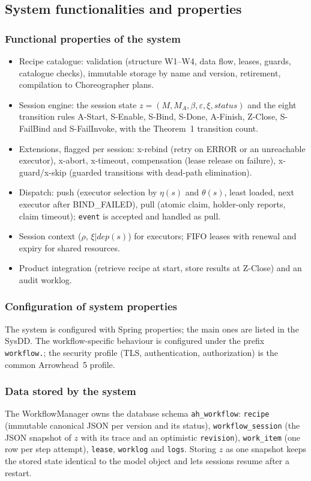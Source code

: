\documentclass[a4paper]{arrowhead}
\begin{document}
\subsection{System functionalities and properties}
\label{sec:properties}
\subsubsection{Functional properties of the system}
\begin{itemize}
\item Recipe catalogue: validation (structure W1--W4, data flow, leases, guards, catalogue checks), immutable storage by
name and version, retirement, compilation to Choreographer plans.
\item Session engine: the session state $z = (M, M_A, \beta, \varepsilon, \xi, status)$ and the eight transition rules
A-Start, S-Enable, S-Bind, S-Done, A-Finish, Z-Close, S-FailBind and S-FailInvoke, with the Theorem~1 transition count.
\item Extensions, flagged per session: x-rebind (retry on ERROR or an unreachable executor), x-abort, x-timeout,
compensation (lease release on failure), x-guard/x-skip (guarded transitions with dead-path elimination).
\item Dispatch: push (executor selection by $\eta(s)$ and $\theta(s)$, least loaded, next executor after BIND\_FAILED),
pull (atomic claim, holder-only reports, claim timeout); \texttt{event} is accepted and handled as pull.
\item Session context ($\rho$, $\xi|dep(s)$) for executors; FIFO leases with renewal and expiry for shared resources.
\item Product integration (retrieve recipe at start, store results at Z-Close) and an audit worklog.
\end{itemize}

\subsubsection{Configuration of system properties}
The system is configured with Spring properties; the main ones are listed in the SysDD. The workflow-specific behaviour
is configured under the prefix \texttt{workflow.}; the security profile (TLS, authentication, authorization) is the
common Arrowhead~5 profile.

\subsubsection{Data stored by the system}
The WorkflowManager owns the database schema \texttt{ah\_workflow}: \texttt{recipe} (immutable canonical JSON per
version and its status), \texttt{workflow\_session} (the JSON snapshot of $z$ with its trace and an optimistic
\texttt{revision}), \texttt{work\_item} (one row per step attempt), \texttt{lease}, \texttt{worklog} and \texttt{logs}.
Storing $z$ as one snapshot keeps the stored state identical to the model object and lets sessions resume after a
restart.
\end{document}
